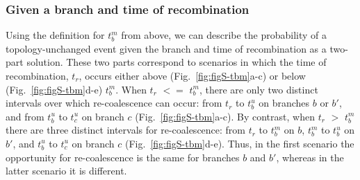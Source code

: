 \documentclass[11pt]{article}
\begin{document}

\subsubsection{Given a branch and time of recombination}
Using the definition for $t_b^m$ from above, we can describe the probability
of a topology-unchanged event given the branch and time of recombination
as a two-part solution. These two parts correspond to scenarios in which
the time of recombination, $t_r$, occurs either above (Fig.~\ref{fig:figS-tbm}a-c)
or below (Fig.~\ref{fig:figS-tbm}d-e) $t_b^m$. When $t_r$ $<=$ $t_b^m$, there
are only two distinct intervals over which re-coalescence can occur: from
$t_r$ to $t_b^u$ on branches $b$ or $b'$, and from $t_b^u$ to $t_c^u$ on 
branch $c$ (Fig.~\ref{fig:figS-tbm}a-c). By contrast, when $t_r$ $>$ $t_b^m$
there are three distinct intervals for re-coalescence: from $t_r$ to $t_b^m$
on $b$, $t_b^m$ to $t_b^u$ on $b'$, and $t_b^u$ to $t_c^u$ on 
branch $c$ (Fig.~\ref{fig:figS-tbm}d-e). Thus, in the first scenario 
the opportunity for re-coalescence is the same for branches $b$ 
and $b'$, whereas in the latter scenario it is different.
\end{document}
